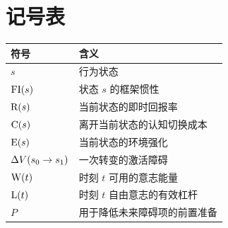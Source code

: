 \section{记号表}

\begin{center}
\begin{tabularx}{\textwidth}{@{}l X@{}}
\toprule
符号 & 含义 \\
\midrule
$s$ & 行为状态 \\
$\mathrm{FI}(s)$ & 状态 $s$ 的框架惯性 \\
$\mathrm{R}(s)$ & 当前状态的即时回报率 \\
$\mathrm{C}(s)$ & 离开当前状态的认知切换成本 \\
$\mathrm{E}(s)$ & 当前状态的环境强化 \\
$\Delta V(s_0 \to s_1)$ & 一次转变的激活障碍 \\
$\mathrm{W}(t)$ & 时刻 $t$ 可用的意志能量 \\
$\mathrm{L}(t)$ & 时刻 $t$ 自由意志的有效杠杆 \\
$P$ & 用于降低未来障碍项的前置准备 \\
\bottomrule
\end{tabularx}
\end{center}